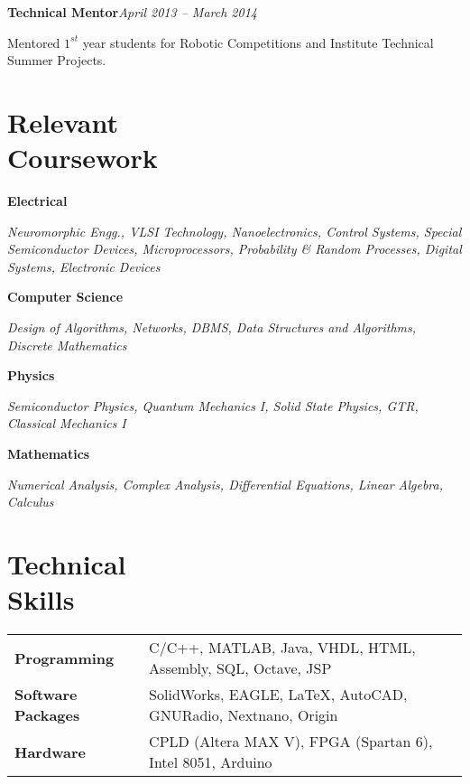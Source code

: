 \documentclass[margin,line]{res}
\newenvironment{list1}{
  \begin{list}{\ding{113}}{%
      \setlength{\itemsep}{0in}
      \setlength{\parsep}{0in} \setlength{\parskip}{0in}
      \setlength{\topsep}{0in} \setlength{\partopsep}{0in} 
      \setlength{\leftmargin}{0.17in}}}{\end{list}}
\begin{document}
\begin{resume}
\textbf{Technical Mentor}\hfill \textit{April 2013 -- March 2014}\\
\vspace*{-.15in}
\begin{list1}
\item[]Mentored $1^{st}$ year students for Robotic Competitions and Institute Technical Summer Projects.
\end{list1}

\section{\sc Relevant \\Coursework} 
\begin{list1}
\item[\strut\hspace{0.5cm}\hypertarget{crselst}{\textbf{Electrical}}]
\item[]\textit{Neuromorphic Engg., VLSI Technology, Nanoelectronics, Control Systems, Special Semiconductor Devices, Microprocessors, Probability \& Random Processes, Digital Systems, Electronic Devices}
\item[\strut\hspace{0.5cm}\textbf{Computer Science}]
\vspace{0.05in}
\item[]\textit{Design of Algorithms, Networks, DBMS, Data Structures and Algorithms, Discrete Mathematics}
\item[\strut\hspace{0.5cm}\textbf{Physics}]
\vspace{0.05in}
\item[]\textit{Semiconductor Physics, Quantum Mechanics I, Solid State Physics, GTR, Classical Mechanics I}
\item[\strut\hspace{0.5cm}\textbf{Mathematics}]
\vspace{0.05in}
\item[]\textit{Numerical Analysis, Complex Analysis, Differential Equations, Linear Algebra, Calculus}
\end{list1}

\section{\sc Technical \\Skills} 
\begin{tabular}{@{}p{1.3in}p{4.3in}}
\textbf{Programming} & C/C++, MATLAB, Java, VHDL, HTML, Assembly, SQL, Octave, JSP \\  
\vspace*{-0.06in}
\textbf{Software Packages} & 
\vspace*{-0.06in}
SolidWorks, EAGLE, \LaTeX, AutoCAD, GNURadio, Nextnano, Origin\\ 
\vspace*{-0.06in}
\textbf{Hardware} &
\vspace*{-0.06in}
CPLD (Altera MAX V), FPGA (Spartan 6), Intel 8051, Arduino\\     
\end{tabular}


\end{resume}
\end{document}
